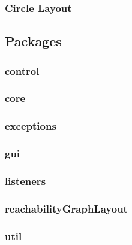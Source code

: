 \documentclass[10pt, a4paper]{article}
\begin{document}
\subsubsection{Circle Layout}
\label{label:circleLayout}

\subsection{Packages}

\subsubsection{control}

\subsubsection{core}
\subsubsection{exceptions}
\subsubsection{gui}
\subsubsection{listeners}
\subsubsection{reachabilityGraphLayout}
\subsubsection{util}










 
%

%
\end{document}
